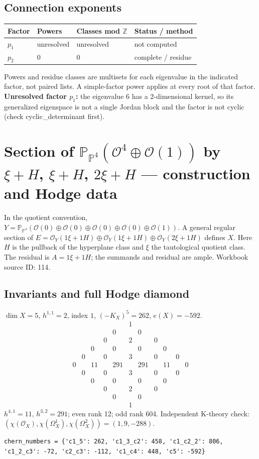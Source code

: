 \documentclass[10pt,a4paper]{article}
\begin{document}
\subsection*{Connection exponents}
\begin{center}\begin{tabular}{llll}\toprule Factor & Powers & Classes mod $\mathbb Z$ & Status / method\\\midrule
$p_{1}$ & unresolved & unresolved & not computed\\
$p_{2}$ & $0$ & $0$ & complete / residue\\
\bottomrule\end{tabular}\end{center}
Powers and residue classes are multisets for each eigenvalue in the indicated factor, not paired lists. A simple-factor power applies at every root of that factor.
\textbf{Unresolved factor $p_{1}$:} the eigenvalue 6 has a 2-dimensional kernel, so its generalized eigenspace is not a single Jordan block and the factor is not cyclic (check cyclic\_determinant first).
\clearpage\section*{Section of $\mathbb P_{\mathbb P^{4}}(\mathcal O^{4}\oplus \mathcal O(1))$ by $\xi +H$, $\xi +H$, $2\xi +H$ --- construction and Hodge data}\label{entry:PB5-114}
In the quotient convention, $Y=\mathbb P_{\mathbb P^{4}}(\mathcal O(0)\oplus\mathcal O(0)\oplus\mathcal O(0)\oplus\mathcal O(0)\oplus\mathcal O(1))$.
A general regular section of $E=\mathcal O_Y(1\xi+1H)\oplus\mathcal O_Y(1\xi+1H)\oplus\mathcal O_Y(2\xi+1H)$ defines $X$.
Here $H$ is the pullback of the hyperplane class and $\xi$ the tautological quotient class. The residual is $A=1\xi+1H$; the summands and residual are ample.
Workbook source ID: 114.
\subsection*{Invariants and full Hodge diamond}
$\dim X=5$, $h^{1,1}=2$, index $1$, $(-K_X)^5=262$, $e(X)=-592$.
\[\begin{array}{ccccccccccc}&&&&&1&&&&&\\&&&&0&&0&&&&\\&&&0&&2&&0&&&\\&&0&&0&&0&&0&&\\&0&&0&&3&&0&&0&\\0&&11&&291&&291&&11&&0\\&0&&0&&3&&0&&0&\\&&0&&0&&0&&0&&\\&&&0&&2&&0&&&\\&&&&0&&0&&&&\\&&&&&1&&&&&\end{array}\]
$h^{4,1}=11$, $h^{3,2}=291$; even rank 12; odd rank 604.
Independent K-theory check: $(\chi(\mathcal O_X),\chi(\Omega_X^1),\chi(\Omega_X^2))=(1, 9, -288)$.
\begin{lstlisting}
chern_numbers = {'c1_5': 262, 'c1_3_c2': 458, 'c1_c2_2': 806, 'c1_2_c3': -72, 'c2_c3': -112, 'c1_c4': 448, 'c5': -592}
\end{lstlisting}
\end{document}
